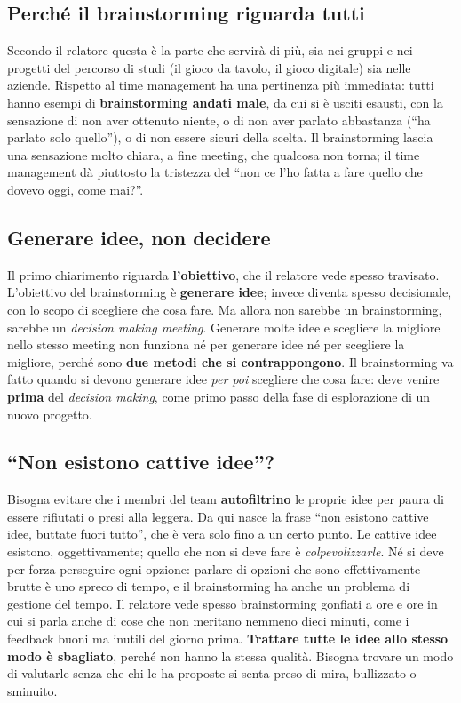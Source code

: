 \subsection{Perché il brainstorming riguarda tutti}

Secondo il relatore questa è la parte che servirà di più, sia nei gruppi e nei
progetti del percorso di studi (il gioco da tavolo, il gioco digitale) sia nelle
aziende. Rispetto al time management ha una pertinenza più immediata: tutti
hanno esempi di \textbf{brainstorming andati male}, da cui si è usciti esausti, con
la sensazione di non aver ottenuto niente, o di non aver parlato abbastanza (``ha
parlato solo quello''), o di non essere sicuri della scelta. Il brainstorming lascia
una sensazione molto chiara, a fine meeting, che qualcosa non torna; il time
management dà piuttosto la tristezza del ``non ce l'ho fatta a fare quello che
dovevo oggi, come mai?''.

\subsection{Generare idee, non decidere}

Il primo chiarimento riguarda \textbf{l'obiettivo}, che il relatore vede spesso
travisato. L'obiettivo del brainstorming è \textbf{generare idee}; invece diventa
spesso decisionale, con lo scopo di scegliere che cosa fare. Ma allora non sarebbe
un brainstorming, sarebbe un \emph{decision making meeting}. Generare molte idee e
scegliere la migliore nello stesso meeting non funziona né per generare idee né per
scegliere la migliore, perché sono \textbf{due metodi che si contrappongono}. Il
brainstorming va fatto quando si devono generare idee \emph{per poi} scegliere che
cosa fare: deve venire \textbf{prima} del \emph{decision making}, come primo passo
della fase di esplorazione di un nuovo progetto.

\subsection{``Non esistono cattive idee''?}

Bisogna evitare che i membri del team \textbf{autofiltrino} le proprie idee per paura
di essere rifiutati o presi alla leggera. Da qui nasce la frase ``non esistono
cattive idee, buttate fuori tutto'', che è vera solo fino a un certo punto. Le
cattive idee esistono, oggettivamente; quello che non si deve fare è
\emph{colpevolizzarle}. Né si deve per forza perseguire ogni opzione: parlare di
opzioni che sono effettivamente brutte è uno spreco di tempo, e il brainstorming ha
anche un problema di gestione del tempo. Il relatore vede spesso brainstorming
gonfiati a ore e ore in cui si parla anche di cose che non meritano nemmeno dieci
minuti, come i feedback buoni ma inutili del giorno prima. \textbf{Trattare tutte le
idee allo stesso modo è sbagliato}, perché non hanno la stessa qualità. Bisogna
trovare un modo di valutarle senza che chi le ha proposte si senta preso di mira,
bullizzato o sminuito.

